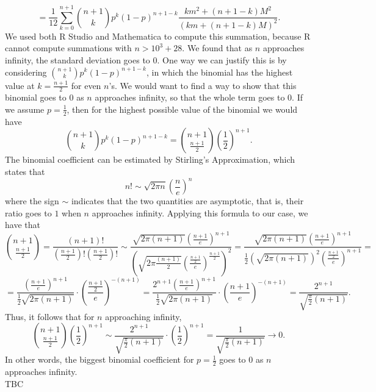 \documentclass[11pt, twoside, reqno]{book}
\begin{document}
$$=\frac{1}{12} \sum^{n+1}_{k=0} \binom{n+1}{k} p^{k}(1-p)^{n+1-k}\frac{km^{2}+(n+1-k)M^{2}}{(km+(n+1-k)M)^2}.$$
We used both R Studio and Mathematica to compute this summation, because R cannot compute summations with $n > 10^{3}+28$. We found that as $n$ approaches infinity, the standard deviation goes to $0$. One way we can justify this is by considering $\binom{n+1}{k} p^{k}(1-p)^{n+1-k}$, in which the binomial has the highest value at $k = \frac{n+1}{2}$ for even $n$'s. We would want to find a way to show that this binomial goes to $0$ as $n$ approaches infinity, so that the whole term goes to $0$. If we assume $p=\frac{1}{2}$, then for the highest possible value of the binomial we would have
$$\binom{n+1}{k} p^{k}(1-p)^{n+1-k}=\binom{n+1}{\frac{n+1}{2}} \left(\frac{1}{2}\right)^{n+1}.$$
The binomial coefficient can be estimated by Stirling's Approximation, which states that 
$$n! \sim \sqrt{2\pi n} \left(\frac{n}{e} \right)^{n}$$
where the sign $\sim$ indicates that the two quantities are asymptotic, that is, their ratio goes to $1$ when $n$ approaches infinity. Applying this formula to our case, we have that
$$\binom{n+1}{\frac{n+1}{2}}=\frac{(n+1)!}{\left(\frac{n+1}{2}\right)!\left(\frac{n+1}{2}\right)!} \sim \frac{\sqrt{2\pi(n+1)}\left(\frac{n+1}{e}\right)^{n+1}}{\left(\sqrt{2\pi\frac{(n+1)}{2}}\left(\frac{\frac{n+1}{2}}{e}\right)^{\frac{n+1}{2}}\right)^{2}}= \frac{\sqrt{2\pi(n+1)}\left(\frac{n+1}{e}\right)^{n+1}}{\frac{1}{2}\left(\sqrt{2\pi(n+1)}\right)^{2} \left(\frac{\frac{n+1}{2}}{e}\right)^{n+1}}=$$
$$=\frac{\left(\frac{n+1}{e}\right)^{n+1}}{\frac{1}{2}\sqrt{2\pi(n+1)}} \cdot \left(\frac{\frac{n+1}{2}}{e}\right)^{-(n+1)}=\frac{2^{n+1}\left(\frac{n+1}{e}\right)^{n+1}}{\frac{1}{2}\sqrt{2\pi(n+1)}} \cdot \left(\frac{n+1}{e}\right)^{-(n+1)}=\frac{2^{n+1}}{\sqrt{\frac{\pi}{2}(n+1)}}.$$
Thus, it follows that for $n$ approaching infinity,
$$\binom{n+1}{\frac{n+1}{2}} \left(\frac{1}{2}\right)^{n+1} \sim \frac{2^{n+1}}{\sqrt{\frac{\pi}{2}(n+1)}} \cdot\left(\frac{1}{2}\right)^{n+1} = \frac{1}{\sqrt{\frac{\pi}{2}(n+1)}} \to 0.$$
In other words, the biggest binomial coefficient for $p=\frac{1}{2}$ goes to $0$ as $n$ approaches infinity.
\\
TBC \\
\end{document}
